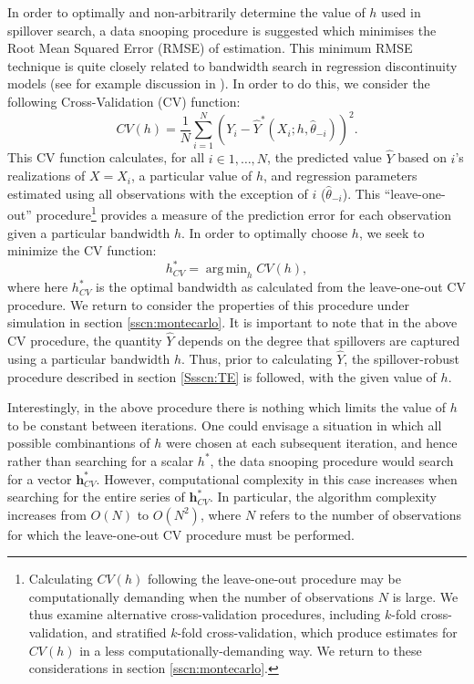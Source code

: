 \documentclass[12pt]{article}
\DeclareMathOperator*{\argmin}{arg\,min}
\begin{document}
\begin{spacing}{1.3}
In order to optimally and non-arbitrarily determine the value of $h$ used in
spillover search, a data snooping procedure is suggested which minimises the
Root Mean Squared Error (RMSE) of estimation.  This minimum RMSE technique is
quite closely related to bandwidth search in regression discontinuity models
(see for example discussion in \citet{LudwigMiller2007,ImbensLemieux2008}). In
order to do this, we consider the following Cross-Validation (CV) function:
\[
CV(h)=\frac{1}{N}\sum_{i=1}^N (Y_i-\widehat{Y}^*(X_i;h,\widehat\theta_{-i}))^2.
\]
This CV function calculates, for all $i\in 1,\ldots,N$, the predicted value
$\widehat{Y}$ based on $i$'s realizations of $X=X_i$, a particular value of $h$,
and regression parameters estimated using all observations with the exception
of $i$ ($\widehat\theta_{-i}$).  This ``leave-one-out'' procedure\footnote{
  Calculating $CV(h)$ following the leave-one-out procedure may be
  computationally demanding when the number of observations $N$ is large.  We
  thus examine alternative cross-validation procedures, including $k$-fold
  cross-validation, and stratified $k$-fold cross-validation, which produce
  estimates for $CV(h)$ in a less computationally-demanding way.  We return
  to these considerations in section \ref{sscn:montecarlo}.} provides a
measure of the prediction error for each observation given a particular
bandwidth $h$.  In order to optimally choose $h$, we seek to minimize the CV
function:
\[
h_{CV}^* =\argmin_h CV(h),
\]
where here $h_{CV}^*$ is the optimal bandwidth as calculated from the
leave-one-out CV procedure.  We return to consider the properties of this
procedure under simulation in section \ref{sscn:montecarlo}.  It is important
to note that in the above CV procedure, the quantity $\widehat{Y}$ depends on
the degree that spillovers are captured using a particular bandwidth $h$.
Thus, prior to calculating $\widehat{Y}$, the spillover-robust procedure
described in section \ref{Ssscn:TE} is followed, with the given value of
$h$.

Interestingly, in the above procedure there is nothing which limits the
value of $h$ to be constant between iterations.  One could envisage a
situation in which all possible combinantions of $h$ were chosen at each
subsequent iteration, and hence rather than searching for a scalar $h^*$,
the data snooping procedure would search for a vector $\mathbf{h}^*_{CV}$.
However, computational complexity in this case increases when searching for
the entire series of $\mathbf{h}^*_{CV}$.  In particular, the algorithm
complexity increases from $O(N)$ to $O(N^2)$, where $N$ refers to the number
of observations for which the leave-one-out CV procedure must be performed.


\end{spacing}
\end{document}
